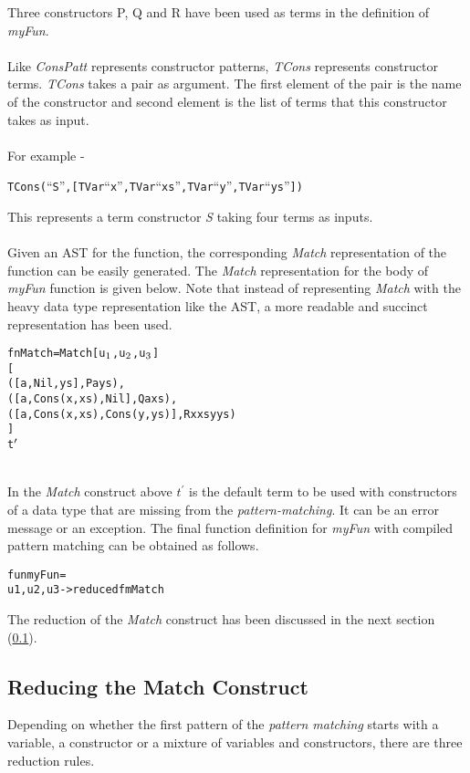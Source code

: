 \documentclass[11pt]{article}
\begin{document}
Three constructors P, Q and R have been used as terms in the definition of {\em myFun}. 
~~\\~~\\ 
Like {\em ConsPatt} represents constructor patterns, {\em TCons}
represents constructor terms. {\em TCons} takes a pair as argument. The first element of the pair is the name of the constructor and second element is the list of terms that this constructor takes as input.
~~\\~~\\
For example - 
\begin{alltt}
TCons (``S'',[TVar ``x'',TVar ``xs'',TVar ``y'',TVar ``ys''])
\end{alltt}
This represents a term constructor {\em S} taking four terms as inputs.
~~\\~~\\
Given an AST for the function, the corresponding {\em Match} representation of the function can be easily generated. The {\em Match} representation for the body of {\em myFun} function is given below. Note that instead of representing {\em Match} with the heavy data type representation like the AST, a more readable and succinct representation has been used.  

\begin{alltt}
fnMatch = Match [u\(\sb{1}\),u\(\sb{2}\),u\(\sb{3}\)]
            [
              ([a,Nil,ys],               P a ys),
              ([a,Cons(x,xs),Nil],       Q a xs),
              ([a,Cons(x,xs),Cons(y,ys)],R x xs y ys)
            ]
            t\(\sp{\prime}\) 
\end{alltt}
~~\\
In the {\em Match} construct above $t^\prime$ is the default term to be used with constructors of a data type that are missing from the {\em pattern-matching}. It can be an error message or an exception. The final function definition for {\em myFun} with compiled pattern matching can be obtained as follows.
\begin{alltt}
fun myFun =
    u1,u2,u3 -> reduced fmMatch
\end{alltt}
The reduction of the {\em Match} construct has been discussed in the next section (\ref{RedMatch}).
\subsection {Reducing the Match Construct} \label{RedMatch}
Depending on whether the first pattern of the {\em pattern matching} starts with a variable, a constructor or a mixture of variables and constructors, there are three reduction rules.
\end{document}
